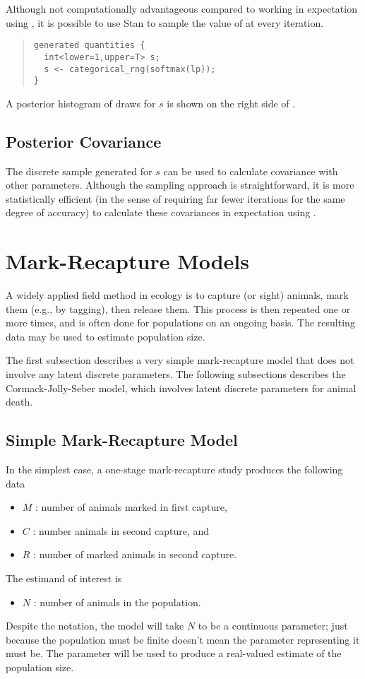 Although not computationally advantageous compared to working in
expectation using , it is possible to use Stan to sample the
value of  at every iteration.
%
\begin{quote}
\begin{Verbatim}
generated quantities {
  int<lower=1,upper=T> s;
  s <- categorical_rng(softmax(lp));
}
\end{Verbatim}
\end{quote}
%
A posterior histogram of draws for $s$ is shown on the right side of
.


\subsection{Posterior Covariance}

The discrete sample generated for $s$ can be used to calculate
covariance with other parameters.  Although the sampling approach is
straightforward, it is more statistically efficient (in the sense of
requiring far fewer iterations for the same degree of accuracy) to
calculate these covariances in expectation using .




\section{Mark-Recapture Models}

A widely applied field method in ecology is to capture (or sight)
animals, mark them (e.g., by tagging), then release them.  This
process is then repeated one or more times, and is often done for
populations on an ongoing basis.  The resulting data may be used to
estimate population size.

The first subsection describes a very simple mark-recapture model that does
not involve any latent discrete parameters.  The following subsections
describes the Cormack-Jolly-Seber model, which involves latent
discrete parameters for animal death.

\subsection{Simple Mark-Recapture Model}

In the simplest case, a one-stage mark-recapture study produces the
following data
%
\begin{itemize}
\item $M$ : number of animals marked in first capture,
\item $C$ : number animals in second capture, and
\item $R$ : number of marked animals in second capture.
\end{itemize}
%
The estimand of interest is
%
\begin{itemize}
\item $N$ : number of animals in the population.
\end{itemize}
%
Despite the notation, the model will take $N$ to be a continuous
parameter; just because the population must be finite doesn't mean the
parameter representing it must be.  The parameter will be used to
produce a real-valued estimate of the population size.

